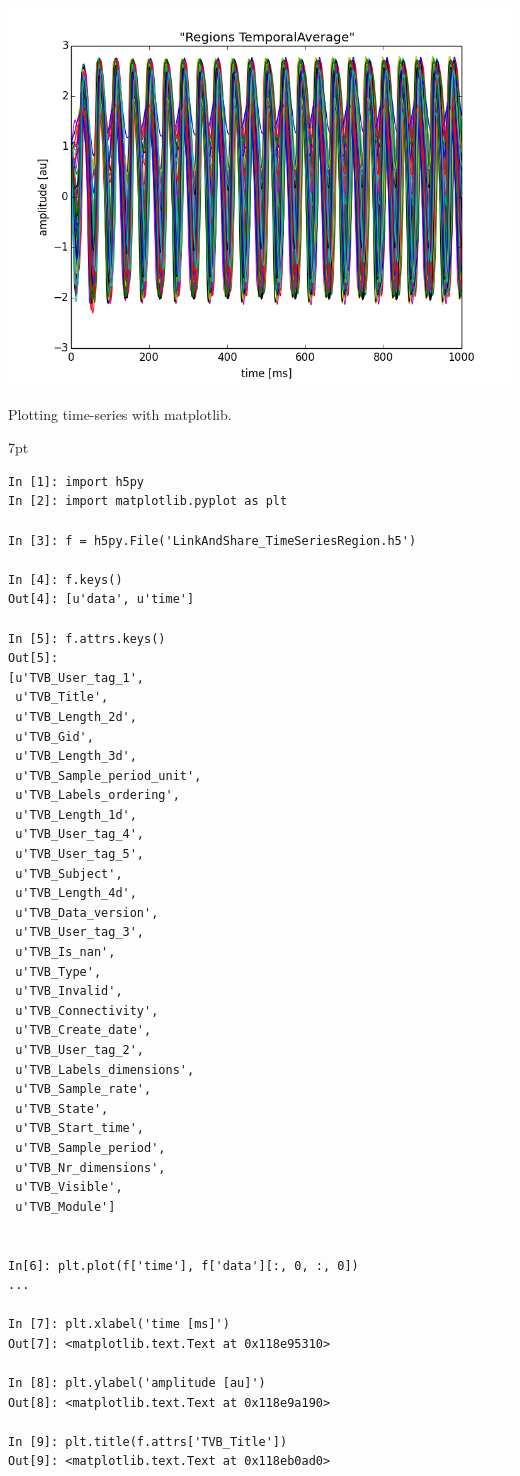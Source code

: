 \documentclass{tufte-handout}
\newenvironment{blah}{%
  \def\FrameCommand{%
    \hspace{1pt}%
    {\color{DarkOrange}\vrule width 2pt}%
    {\color{PeachPuff}\vrule width 4pt}%
    \colorbox{PeachPuff}%
  }%
  \MakeFramed{\advance\hsize-\width\FrameRestore}%
  \noindent\hspace{-4.55pt}%
  \begin{adjustwidth}{}{7pt}%
  \vspace{2pt}\vspace{2pt}%
}
{%
  \vspace{2pt}\end{adjustwidth}\endMakeFramed%
}
\begin{document}
\begin{marginfigure}
  \includegraphics[width=\linewidth]{Handout_UI_LinkAndShare_IpythonTimeSeriesRegion.png}%
  \caption{Plotting time-series with matplotlib.}%
  \label{fig:ipython}%
\end{marginfigure}


\begin{blah}
\begin{verbatim}
In [1]: import h5py
In [2]: import matplotlib.pyplot as plt

In [3]: f = h5py.File('LinkAndShare_TimeSeriesRegion.h5')

In [4]: f.keys()
Out[4]: [u'data', u'time']

In [5]: f.attrs.keys()
Out[5]: 
[u'TVB_User_tag_1',
 u'TVB_Title',
 u'TVB_Length_2d',
 u'TVB_Gid',
 u'TVB_Length_3d',
 u'TVB_Sample_period_unit',
 u'TVB_Labels_ordering',
 u'TVB_Length_1d',
 u'TVB_User_tag_4',
 u'TVB_User_tag_5',
 u'TVB_Subject',
 u'TVB_Length_4d',
 u'TVB_Data_version',
 u'TVB_User_tag_3',
 u'TVB_Is_nan',
 u'TVB_Type',
 u'TVB_Invalid',
 u'TVB_Connectivity',
 u'TVB_Create_date',
 u'TVB_User_tag_2',
 u'TVB_Labels_dimensions',
 u'TVB_Sample_rate',
 u'TVB_State',
 u'TVB_Start_time',
 u'TVB_Sample_period',
 u'TVB_Nr_dimensions',
 u'TVB_Visible',
 u'TVB_Module']


In[6]: plt.plot(f['time'], f['data'][:, 0, :, 0])
...

In [7]: plt.xlabel('time [ms]')
Out[7]: <matplotlib.text.Text at 0x118e95310>

In [8]: plt.ylabel('amplitude [au]')
Out[8]: <matplotlib.text.Text at 0x118e9a190>

In [9]: plt.title(f.attrs['TVB_Title'])
Out[9]: <matplotlib.text.Text at 0x118eb0ad0>
\end{verbatim}
\end{blah}
\end{document}
